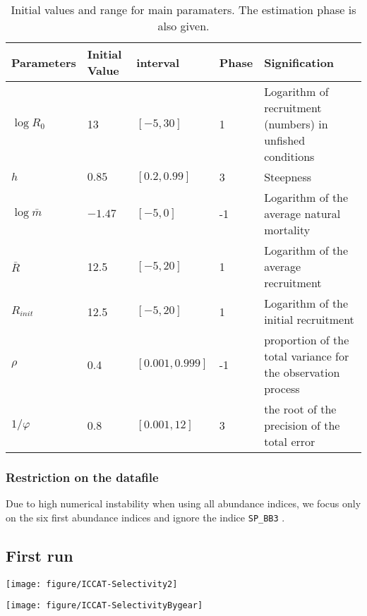 \begin{table}[ht]
\centering
\begin{tabular}{p{2.1cm}p{2.1cm}p{2.2cm}p{2cm}p{6cm}}
  \hline
Parameters & Initial Value & interval & Phase & Signification  \\ \hline
 $\log{R_0}$ & 13  & $[-5,30]$ & 1 & Logarithm of recruitment (numbers) in unfished conditions\\
 $h$ & $0.85$ & $[0.2, 0.99]$ & 3 &  Steepness \\
$\log{\bar{m}}$ & $-1.47$ & $[-5,0]$ &-1 & Logarithm of the average natural mortality\\
$\bar{R}$& 12.5	& $[-5,	20]$ &	1	 & Logarithm of the average recruitment\\
$R_{init}$ & 12.5&	$[-5,	20]$ &	1	 & Logarithm of the initial recruitment\\
$\rho$ & 0.4	& $[0.001,0.999]$ & -1 & proportion of the total variance for the observation process \\
$1/\varphi$ & 0.8 &	$[0.001,	12]$ & 	3 & the root of the precision of the total error \\
\hline
\end{tabular}
\caption{Initial values and range for main paramaters. The estimation phase is also given.}
\label{table:initial}
\end{table}



\subsubsection{Restriction on the datafile}
Due to high numerical instability when using all abundance indices, we focus only on the six first abundance indices and ignore the indice \verb+SP_BB3+ .


\subsection{First run}


{\centering \texttt{[image: figure/ICCAT-Selectivity2]} 

}



{\centering \texttt{[image: figure/ICCAT-SelectivityBygear]} 
}


